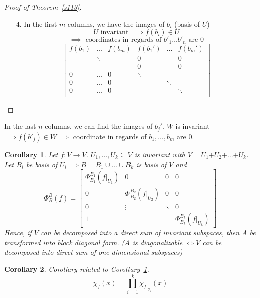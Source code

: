 \documentclass{article}
\newtheorem*{corollary}{Corollary}%
\begin{document}
\begin{proof}[Proof of Theorem~\ref{s113}]
  \begin{enumerate}
    \item[4.] In the first $m$ columns, we have the images of $b_i$ (basis of $U$)
      \[ U \text{ invariant } \implies f(b_i) \in U \]
      \[ \implies \text{ coordinates in regards of } b'_1 \dots b'_n \text{ are } 0 \]
      \[
        \begin{bmatrix}
          f(b_1) & \dots  & f(b_m) & f(b_1') & \dots  & f(b_m') \\
                 & \ddots &        & 0       &        & 0 \\
                 &        &        & 0       &        & 0 \\
          0      & \dots  & 0      & \ddots  &        & \\
          0      & \dots  & 0      &         & \ddots & \\
          0      & \dots  & 0      &         &        & \ddots \\
        \end{bmatrix}
      \]
  \end{enumerate}
\end{proof}

In the last $n$ columns, we can find the images of $b_j'$.
$W$ is invariant $\implies f(b'_j) \in W \implies$ coordinate in regards of $b_1, \dots, b_m$ are $0$.

\begin{corollary} %
  \label{k116}
  Let $f: V \to V$. $U_1, \dots, U_k \subseteq V$ is invariant with $V = U_1 \dot+ U_2 \dot+ \dots \dot+ U_k$.
  Let $B_i$ be basis of $U_i \implies B = B_1 \cup \dots \cup B_k$ is basis of $V$ and
  \[
    \Phi_B^B(f) = \left[\begin{array}{c|ccc}
      \Phi_{B_1}^{B_1}(f|_{U_1}) & 0 & 0 & 0 \\
    \hline
      0 & \Phi_{B_2}^{B_2}(f|_{U_2}) & 0 & 0 \\
      0 & \vdots & \ddots & 0 \\
      1 &   &  & \Phi_{B_k}^{B_k}(f|_{U_k})
    \end{array}\right]
  \]
  Hence, if $V$ can be decomposed into a direct sum of invariant subspaces, then $A$ be transformed into block diagonal form.
  ($A$ is diagonalizable $\iff V$ can be decomposed into direct sum of one-dimensional subspaces)
\end{corollary}

\begin{corollary} %
  Corollary related to Corollary~\ref{k116}.
  \[ \chi_f(x) = \prod_{i=1}^k \chi_{f|_{U_i}}(x) \]
\end{corollary}
\end{document}

